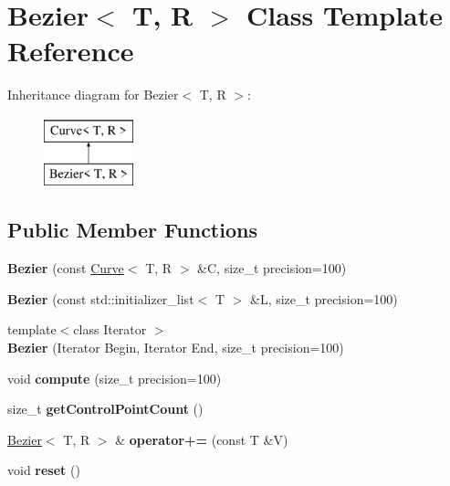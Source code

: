 \hypertarget{class_bezier}{\section{Bezier$<$ T, R $>$ Class Template Reference}
\label{class_bezier}
}
Inheritance diagram for Bezier$<$ T, R $>$\+:\begin{figure}[H]
\begin{center}
\leavevmode
\includegraphics[height=2.000000cm]{class_bezier}
\end{center}
\end{figure}
\subsection*{Public Member Functions}
\begin{DoxyCompactItemize}
\item 
\hypertarget{class_bezier_a7708810890b783088efcc9110ca130bc}{{\bfseries Bezier} (const \hyperlink{class_curve}{Curve}$<$ T, R $>$ \&C, size\+\_\+t precision=100)}\label{class_bezier_a7708810890b783088efcc9110ca130bc}

\item 
\hypertarget{class_bezier_a0886f7c2af8fe37bbd8b10b3ea208ef4}{{\bfseries Bezier} (const std\+::initializer\+\_\+list$<$ T $>$ \&L, size\+\_\+t precision=100)}\label{class_bezier_a0886f7c2af8fe37bbd8b10b3ea208ef4}

\item 
\hypertarget{class_bezier_a48c90931037d5f17ea0e17380ebbd194}{{\footnotesize template$<$class Iterator $>$ }\\{\bfseries Bezier} (Iterator Begin, Iterator End, size\+\_\+t precision=100)}\label{class_bezier_a48c90931037d5f17ea0e17380ebbd194}

\item 
\hypertarget{class_bezier_a61a72b2602f471e3b60196cc2f685efb}{void {\bfseries compute} (size\+\_\+t precision=100)}\label{class_bezier_a61a72b2602f471e3b60196cc2f685efb}

\item 
\hypertarget{class_bezier_a5e87845baa70d59e2c5a14c2155b00ee}{size\+\_\+t {\bfseries get\+Control\+Point\+Count} ()}\label{class_bezier_a5e87845baa70d59e2c5a14c2155b00ee}

\item 
\hypertarget{class_bezier_ab27b6b7a62d2f1765fb4dc89337baf8d}{\hyperlink{class_bezier}{Bezier}$<$ T, R $>$ \& {\bfseries operator+=} (const T \&V)}\label{class_bezier_ab27b6b7a62d2f1765fb4dc89337baf8d}

\item 
\hypertarget{class_bezier_a19985473de96c4718860bd2568084b53}{void {\bfseries reset} ()}\label{class_bezier_a19985473de96c4718860bd2568084b53}

\end{DoxyCompactItemize}
